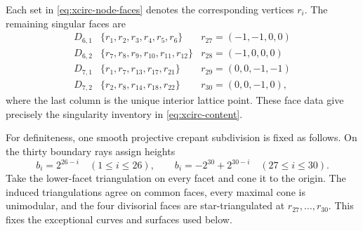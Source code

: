 Each set in \eqref{eq:xcirc-node-faces} denotes the corresponding vertices
$r_i$. The remaining singular faces are
\begin{equation}
\begin{array}{c|c|c}
D_{6,1}&\{r_1,r_2,r_3,r_4,r_5,r_6\}&r_{27}=(-1,-1,0,0)\\
D_{6,2}&\{r_7,r_8,r_9,r_{10},r_{11},r_{12}\}&r_{28}=(-1,0,0,0)\\
D_{7,1}&\{r_1,r_7,r_{13},r_{17},r_{21}\}&r_{29}=(0,0,-1,-1)\\
D_{7,2}&\{r_2,r_8,r_{14},r_{18},r_{22}\}&r_{30}=(0,0,-1,0),
\end{array}
 \label{eq:xcirc-divisorial-faces}
\end{equation}
where the last column is the unique interior lattice point. These face data
give precisely the singularity inventory in \eqref{eq:xcirc-content}.

For definiteness, one smooth projective crepant subdivision is fixed as
follows. On the thirty boundary rays assign heights
\begin{equation}
 b_i=2^{26-i}\quad(1\leq i\leq26),
 \qquad
 b_i=-2^{30}+2^{30-i}\quad(27\leq i\leq30).
 \label{eq:xcirc-resolution-heights}
\end{equation}
Take the lower-facet triangulation on every facet and cone it to the origin.
The induced triangulations agree on common faces, every maximal cone is
unimodular, and the four divisorial faces are star-triangulated at
$r_{27},\ldots,r_{30}$. This fixes the exceptional curves and surfaces used
below.

